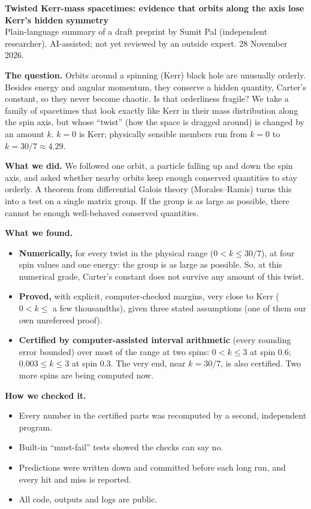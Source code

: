 \documentclass[11pt,a4paper]{article}
\begin{document}
{\Large\bfseries Twisted Kerr-mass spacetimes: evidence that orbits along the axis lose Kerr's hidden symmetry}\\[2pt]
{\small Plain-language summary of a draft preprint by Sumit Pal (independent researcher). AI-assisted; not yet
reviewed by an outside expert. 28 November 2026.}

\textbf{The question.} Orbits around a spinning (Kerr) black hole are unusually orderly. Besides energy and angular
momentum, they conserve a hidden quantity, Carter's constant, so they never become chaotic. Is that orderliness
fragile? We take a family of spacetimes that look exactly like Kerr in their mass distribution along the spin axis,
but whose ``twist'' (how the space is dragged around) is changed by an amount $k$. $k=0$ is Kerr; physically sensible
members run from $k=0$ to $k=30/7\approx4.29$.

\textbf{What we did.} We followed one orbit, a particle falling up and down the spin axis, and asked whether nearby
orbits keep enough conserved quantities to stay orderly. A theorem from differential Galois theory (Morales--Ramis)
turns this into a test on a single matrix group. If the group is as large as possible, there cannot be enough
well-behaved conserved quantities.

\textbf{What we found.}
\begin{itemize}\itemsep2pt
\item \textbf{Numerically,} for every twist in the physical range ($0<k\le30/7$), at four spin values and one
energy: the group is as large as possible. So, at this numerical grade, Carter's constant does not survive any amount of this twist.
\item \textbf{Proved,} with explicit, computer-checked margins, very close to Kerr ($0<k\le$ a few
thousandths), given three stated assumptions (one of them our own unrefereed proof).
\item \textbf{Certified by computer-assisted interval arithmetic} (every rounding error bounded) over most of the
range at two spins: $0<k\le3$ at spin $0.6$; $0.003\le k\le3$ at spin $0.3$. The very end, near $k=30/7$, is also
certified. Two more spins are being computed now.
\end{itemize}

\textbf{How we checked it.}
\begin{itemize}\itemsep2pt
\item Every number in the certified parts was recomputed by a second, independent program.
\item Built-in ``must-fail'' tests showed the checks can say no.
\item Predictions were written down and committed before each long run, and every hit and miss is reported.
\item All code, outputs and logs are public.
\end{itemize}
\end{document}
